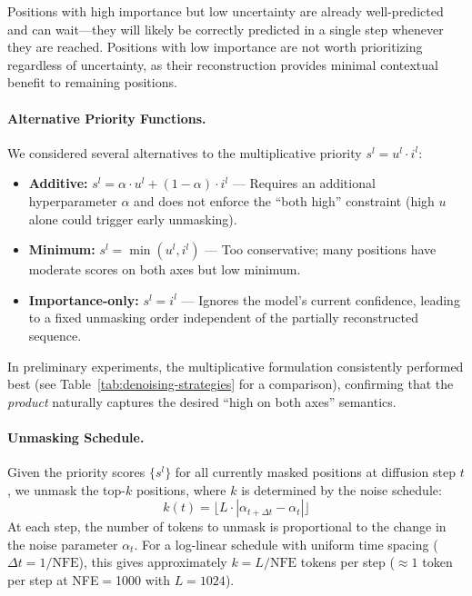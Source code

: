 Positions with high importance but low uncertainty are already well-predicted and can wait---they will likely be correctly predicted in a single step whenever they are reached. Positions with low importance are not worth prioritizing regardless of uncertainty, as their reconstruction provides minimal contextual benefit to remaining positions.

\paragraph{Alternative Priority Functions.} We considered several alternatives to the multiplicative priority $s^l = u^l \cdot i^l$:
\begin{itemize}[leftmargin=*,itemsep=1pt]
    \item \textbf{Additive:} $s^l = \alpha \cdot u^l + (1 - \alpha) \cdot i^l$ --- Requires an additional hyperparameter $\alpha$ and does not enforce the ``both high'' constraint (high $u$ alone could trigger early unmasking).
    \item \textbf{Minimum:} $s^l = \min(u^l, i^l)$ --- Too conservative; many positions have moderate scores on both axes but low minimum.
    \item \textbf{Importance-only:} $s^l = i^l$ --- Ignores the model's current confidence, leading to a fixed unmasking order independent of the partially reconstructed sequence.
\end{itemize}
In preliminary experiments, the multiplicative formulation consistently performed best (see Table~\ref{tab:denoising-strategies} for a comparison), confirming that the \emph{product} naturally captures the desired ``high on both axes'' semantics.

\paragraph{Unmasking Schedule.} Given the priority scores $\{s^l\}$ for all currently masked positions at diffusion step $t$, we unmask the top-$k$ positions, where $k$ is determined by the noise schedule:
\begin{equation}
    k(t) = \lfloor L \cdot |\alpha_{t+\Delta t} - \alpha_t| \rfloor
\end{equation}
At each step, the number of tokens to unmask is proportional to the change in the noise parameter $\alpha_t$. For a log-linear schedule with uniform time spacing ($\Delta t = 1/\text{NFE}$), this gives approximately $k = L / \text{NFE}$ tokens per step ($\approx 1$ token per step at NFE$=$1000 with $L = 1024$).

